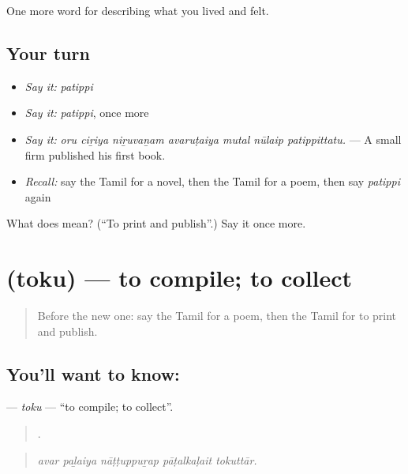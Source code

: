 \begin{grammarlens}[title={What you've built}]
One more word for describing what you lived and felt.
\end{grammarlens}

\subsection*{Your turn}
\begin{itemize}
\raggedright
  \item \emph{Say it:} \emph{patippi}
  \item \emph{Say it:} \emph{patippi}, once more
  \item \emph{Say it:} \emph{oru ciṟiya niṟuvaṉam avaruṭaiya mutal nūlaip patippittatu.} — A small firm published his first book.
  \item \emph{Recall:} say the Tamil for a novel, then the Tamil for a poem, then say \emph{patippi} again
\end{itemize}

\begin{tcolorbox}[breakable,colback=teal!4,colframe=teal!35!black,title={Before you move on}]
What does  mean? (\textquotedblleft{}To print and publish\textquotedblright{}.) Say it once more.
\end{tcolorbox}
\section[\texorpdfstring{\ta{தொகு} (toku)}{தொகு (toku)}]{ (toku) — to compile; to collect}

\label{lesson:TA-C528-toku}



\begin{quote}
Before the new one: say the Tamil for a poem, then the Tamil for to print and publish.
\end{quote}

\subsection*{You'll want to know: }
\textbf{} — \emph{toku} — \textquotedblleft{}to compile; to collect\textquotedblright{}.

\begin{quote}
    .
\end{quote}

\begin{quote}
\emph{avar paḻaiya nāṭṭuppuṟap pāṭalkaḷait tokuttār.}
\end{quote}

